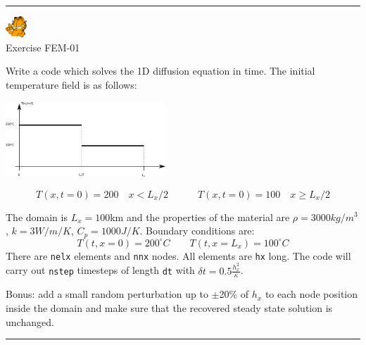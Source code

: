 \begin{center}
\begin{minipage}[t]{0.77\textwidth}
\par\noindent\rule{\textwidth}{0.4pt}

\begin{center}
\includegraphics[width=0.8cm]{images/garftr} \\
{\color{orange}Exercise FEM-01}
\end{center}

Write a code which solves the 1D diffusion equation in time. 
The initial temperature field is as follows:
\begin{center}
\includegraphics[width=6cm]{images/fem_exercises/tempinit}
\end{center}
\[
T(x,t=0)=200 \quad x<L_x/2
\quad\quad\quad
T(x,t=0)=100 \quad x\geq L_x/2
\]

The domain is $L_x=100$km and the properties of the material are 
$\rho=3000kg/m^3$, $k=3W/m/K$, $C_p=1000J/K$.
Boundary conditions are:
\[
T(t,x=0)=200^\circ C
\quad\quad
T(t,x=L_x)=100^\circ C
\]
There are {\tt nelx} elements and {\tt nnx} nodes.
All elements are {\tt hx} long.
The code will carry out {\tt nstep} timesteps of length {\tt dt}
with 
$\delta t = 0.5 \frac{h^2_x}{\kappa}$.

Bonus: add a small random perturbation up to $\pm$20\% of $h_x$ to each node position 
inside the domain and make sure that the recovered steady state solution is unchanged.

\par\noindent\rule{\textwidth}{0.4pt}
\end{minipage}
\end{center}

